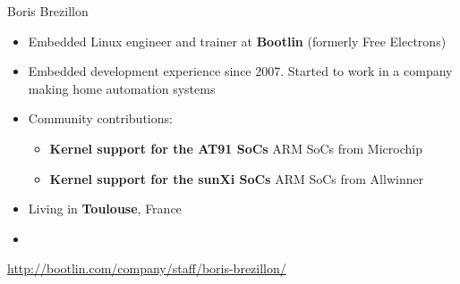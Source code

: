 \begin{frame}{Boris Brezillon}
    \begin{itemize}
	\item Embedded Linux engineer and trainer at {\bf Bootlin}
	      (formerly Free Electrons)
	\item Embedded development experience since 2007. Started
	      to work in a company making home automation systems
        \item Community contributions:
	\begin{itemize}
		\item {\bf Kernel support for the AT91 SoCs} ARM SoCs from Microchip
		\item {\bf Kernel support for the sunXi SoCs} ARM SoCs from Allwinner
	\end{itemize}
	\item Living in {\bf Toulouse}, France
	\item {}
    \end{itemize}
    {\small \url{http://bootlin.com/company/staff/boris-brezillon/}}
\end{frame}

